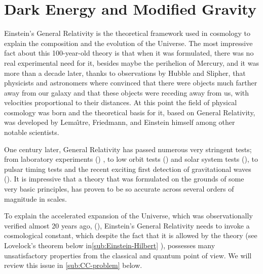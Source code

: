 
\chapter{Dark Energy and Modified Gravity \label{Overview}} %



\newcommand{\keyword}[1]{\textbf{#1}}
\newcommand{\tabhead}[1]{\textbf{#1}}
\newcommand{\code}[1]{\texttt{#1}}
\newcommand{\file}[1]{\texttt{\bfseries#1}}
\newcommand{\option}[1]{\texttt{\itshape#1}}

%

Einstein's General Relativity is the theoretical framework used in cosmology to explain the
composition and the evolution of the Universe.
The most impressive fact about this 100-year-old theory is that
when it was formulated, there was no real experimental need for it, besides maybe the
perihelion of Mercury, and it was more than a decade later, thanks to observations
by Hubble and Slipher, that physicists and astronomers where convinced that there were objects much farther away from
our galaxy and that these objects were receding away from us, with velocities proportional
to their distances. At this point the field of physical cosmology was born and the theoretical basis for it,
based on General Relativity, was developed by Lema\^{\i}tre, Friedmann, and Einstein himself among other
notable scientists.

One century later, General Relativity has passed numerous very stringent tests; from laboratory experiments (\cite{cite}) , to
low orbit tests (\cite{cite}) and solar system tests (\cite{cite}), to pulsar timing tests and the recent
exciting first detection of gravitational waves (\cite{cite}).
It is impressive that a theory that was formulated on the grounds of some very basic
principles, has proven to be so accurate across several orders of magnitude in scales.

To explain the accelerated expansion of the Universe, which was observationally verified almost 20 years ago,
(\cite{cite, supernova, 1998}), Einstein's General Relativity needs to invoke a cosmological constant, which despite the fact that
it is allowed by the theory (see Lovelock's theorem below in\cref{sub:Einstein-Hilbert} ),
possesses many unsatisfactory properties from the classical and quantum point of view. 
We will review this issue in \cref{sub:CC-problem} below.


